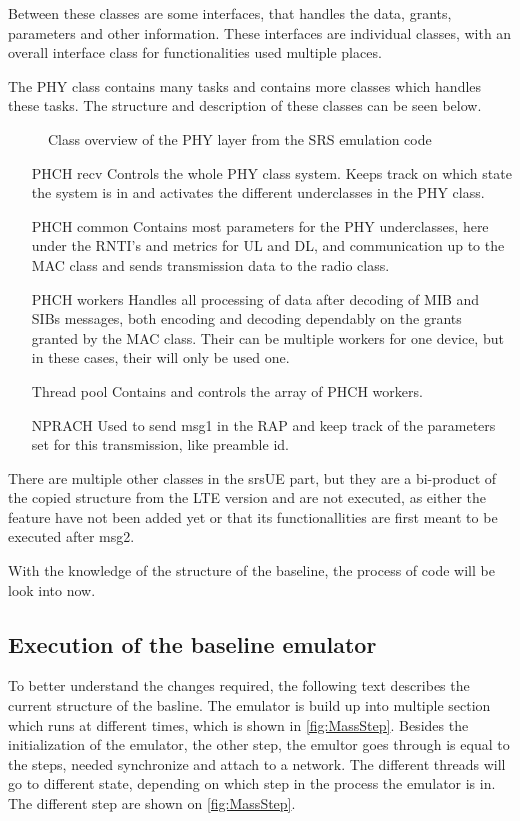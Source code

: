 Between these classes are some interfaces, that handles the  data, grants, parameters and other information. These interfaces are individual classes, with an overall interface class for functionalities used multiple places. 

The PHY class contains many tasks and contains more classes which handles these tasks. The structure and description of these classes can be seen below.

\begin{figure}[H]
\centering
{}
\resizebox{0.5\textwidth}{!}{
}
\caption{Class overview of the PHY layer from the SRS emulation code}
\label{fig:PhyClass}
\end{figure}

\begin{itemize}
\item [PHCH recv] Controls the whole PHY class system. Keeps track on which state the system is in and activates the different underclasses in the PHY class.
\item [PHCH common] Contains most parameters for the PHY underclasses, here under the RNTI's and metrics for UL and DL, and communication up to the MAC class and sends transmission data to the radio class.
\item [PHCH workers] Handles all processing of data after decoding of MIB and SIBs messages, both encoding and decoding dependably on the grants granted by the MAC class. Their can be multiple workers for one device, but in these cases, their will only be used one.
\item [Thread pool] Contains and controls the array of PHCH workers.	
\item [NPRACH] Used to send msg1 in the RAP and keep track of the parameters set for this transmission, like preamble id.
\end{itemize}

There are multiple other classes in the srsUE part, but they are a bi-product of the copied structure from the LTE version and are not executed, as either the feature have not been added yet or that its functionallities are first meant to be executed after msg2.

With the knowledge of the structure of the baseline, the process of code will be look into now.


\subsection{Execution of the baseline emulator}
To better understand the changes required, the following text describes the current structure of the basline. The emulator is build up into multiple section which runs at different times, which is shown in \autoref{fig:MassStep}. Besides the initialization of the emulator, the other step, the emultor goes through is equal to the steps, needed synchronize and attach to a network. The different threads will go to different state, depending on which step in the process the emulator is in. The different step are shown on \autoref{fig:MassStep}.

